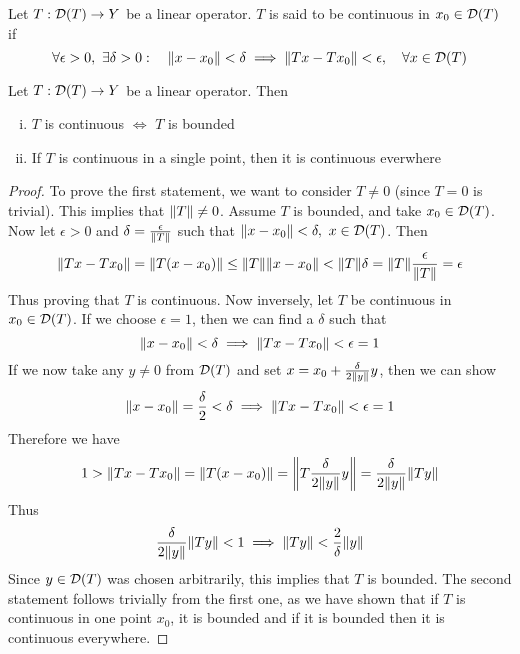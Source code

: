 \documentclass[../../script.tex]{subfiles}
\begin{document}
\begin{defi}
    Let $T: \mathcal{D}(T) \rightarrow Y$ be a linear operator. $T$ is said to be continuous in $x_0 \in \mathcal{D}(T)$ if 
    \[
        \forall \epsilon > 0, ~\exists \delta > 0: \quad \norm{x - x_0} < \delta \implies \norm{Tx - Tx_0} < \epsilon, \quad \forall x \in \mathcal{D}(T)
    \]
\end{defi}

\begin{thm}
    Let $T: \mathcal{D}(T) \rightarrow Y$ be a linear operator. Then 
    \begin{enumerate}[(i)]
        \item $T$ is continuous $\iff$ $T$ is bounded 
        \item If $T$ is continuous in a single point, then it is continuous everwhere
    \end{enumerate}
\end{thm}
\begin{proof}
    To prove the first statement, we want to consider $T \ne 0$ (since $T = 0$ is trivial). This implies that $\norm{T} \ne 0$.
    Assume $T$ is bounded, and take $x_0 \in \mathcal{D}(T)$. Now let $\epsilon > 0$ and $\delta = \frac{\epsilon}{\norm{T}}$ such that 
    $\norm{x - x_0} < \delta, ~x \in \mathcal{D}(T)$. Then
    \begin{equation}
        \norm{Tx - Tx_0} = \norm{T(x - x_0)} \le \norm{T}\norm{x - x_0} < \norm{T} \delta = \norm{T} \frac{\epsilon}{\norm{T}} = \epsilon
    \end{equation}
    Thus proving that $T$ is continuous. Now inversely, let $T$ be continuous in $x_0 \in \mathcal{D}(T)$. If we choose $\epsilon = 1$, then we can find a $\delta$ such that 
    \begin{equation}
        \norm{x - x_0} < \delta \implies \norm{Tx - Tx_0} < \epsilon = 1
    \end{equation}
    If we now take any $y \ne 0$ from $\mathcal{D}(T)$ and set $x = x_0 + \frac{\delta}{2 \norm{y}} y$, then we can show 
    \begin{equation}
        \norm{x - x_0} = \frac{\delta}{2} < \delta \implies \norm{Tx - Tx_0} < \epsilon = 1
    \end{equation}
    Therefore we have 
    \begin{equation}
        1 > \norm{Tx - Tx_0} = \norm{T(x - x_0)} = \norm{T \frac{\delta}{2\norm{y}} y} = \frac{\delta}{2\norm{y}} \norm{Ty}
    \end{equation}
    Thus
    \begin{equation}
        \frac{\delta}{2\norm{y}} \norm{Ty} < 1 \implies \norm{Ty} < \frac{2}{\delta} \norm{y}
    \end{equation}
    Since $y \in \mathcal{D}(T)$ was chosen arbitrarily, this implies that $T$ is bounded. The second statement follows trivially from the first one,
    as we have shown that if $T$ is continuous in one point $x_0$, it is bounded and if it is bounded then it is continuous everywhere.
\end{proof}
\end{document}
